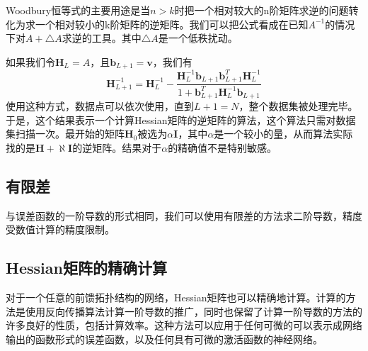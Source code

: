 Woodbury恒等式的主要用途是当$n>k$时把一个相对较大的n阶矩阵求逆的问题转化为求一个相对较小的k阶矩阵的逆矩阵。我们可以把公式看成在已知$A^{-1}$的情况下对$A+\triangle A$求逆的工具。其中$\triangle A$是一个低秩扰动。

如果我们令$\boldsymbol{H}_L=A$，且$\boldsymbol{b}_{L+1}=\boldsymbol{v}$，我们有
\begin{equation}
	\boldsymbol{H}_{L+1}^{-1}=\boldsymbol{H}_{L}^{-1}-\frac{\boldsymbol{H}_{L}^{-1}\boldsymbol{b}_{L+1}\boldsymbol{b}_{L+1}^T\boldsymbol{H}_L^{-1} }{1+\boldsymbol{b}_{L+1}^T\boldsymbol{H}_L^{-1}\boldsymbol{b}_{L+1} }
\end{equation}
使用这种方式，数据点可以依次使用，直到$L+1=N$，整个数据集被处理完毕。于是，这个结果表示一个计算Hessian矩阵的逆矩阵的算法，这个算法只需对数据集扫描一次。最开始的矩阵$\boldsymbol{H}_0$被选为$\alpha \boldsymbol{I}$，其中$\alpha$是一个较小的量，从而算法实际找的是$\boldsymbol{H}+\aleph \boldsymbol{I}$的逆矩阵。结果对于$\alpha$的精确值不是特别敏感。
\subsection*{有限差}
与误差函数的一阶导数的形式相同，我们可以使用有限差的方法求二阶导数，精度受数值计算的精度限制。
\subsection*{Hessian矩阵的精确计算}
对于一个任意的前馈拓扑结构的网络，Hessian矩阵也可以精确地计算。计算的方法是使用反向传播算法计算一阶导数的推广，同时也保留了计算一阶导数的方法的许多良好的性质，包括计算效率。这种方法可以应用于任何可微的可以表示成网络输出的函数形式的误差函数，以及任何具有可微的激活函数的神经网络。

